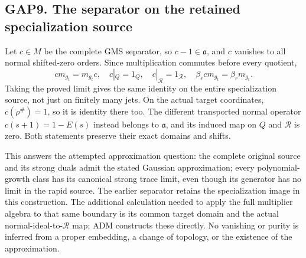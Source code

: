 \subsection{GAP9. The separator on the retained specialization
source}\label{gap9.-the-separator-on-the-retained-specialization-source}

Let \(c\in M\) be the complete GMS separator, so \(c-1\in\mathfrak a\),
and \(c\) vanishes to all normal shifted-zero orders. Since
multiplication commutes before every quotient, \[
cm_{g_t}=m_{g_t}c,\quad c|_Q=1_Q,\quad c|_{\mathcal R}=1_{\mathcal R},
\quad\beta_rcm_{g_t}=\beta_rm_{g_t}.
\tag{GAP9.1}
\] Taking the proved limit gives the same identity on the entire
specialization source, not just on finitely many jets. On the actual
target coordinates, \(c(\rho^\#)=1\), so it is identity there too. The
different transported normal operator \(c(s+1)=1-E(s)\) instead belongs
to \(\mathfrak a\), and its induced map on \(Q\) and \(\mathcal R\) is
zero. Both statements preserve their exact domains and shifts.

This answers the attempted approximation question: the complete original
source and its strong duals admit the stated Gaussian approximation;
every polynomial-growth class has its canonical strong trace limit, even
though its generator has no limit in the rapid source. The earlier
separator retains the specialization image in this construction. The
additional calculation needed to apply the full multiplier algebra to
that same boundary is its common target domain and the actual
normal-ideal-to-\(\mathcal R\) map; ADM constructs these directly. No
vanishing or purity is inferred from a proper embedding, a change of
topology, or the existence of the approximation.
